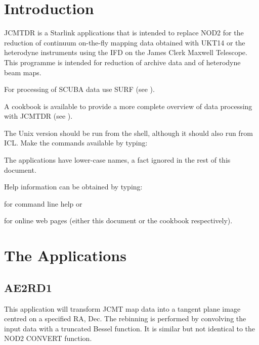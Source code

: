 \documentclass[twoside,11pt,nolof]{starlink}
\begin{document}
\scfrontmatter

\section{Introduction}

JCMTDR is a Starlink applications that is intended to replace NOD2 \cite{nod2}
for the reduction of continuum on-the-fly mapping data obtained with UKT14
\cite{ukt14} or the heterodyne instruments using the IFD on the James Clerk
Maxwell Telescope. This programme is intended for reduction of archive data
and of heterodyne beam maps.

For processing of SCUBA data use SURF (see ).

A cookbook is available to provide a more complete overview of data processing
with JCMTDR (see ).

The Unix version should be run from the shell, although it should also
run from ICL. Make the commands available by typing:

\begin{terminalv}
\end{terminalv}

The applications have lower-case names, a fact ignored in the rest of
this document.

Help information can be obtained by typing:

\begin{terminalv}
\end{terminalv}

for command line help or

\begin{terminalv}
\end{terminalv}

for online web pages (either this document or the cookbook respectively).

\goodbreak

\section{The Applications}

\subsection{AE2RD1}

This application will transform JCMT map data into a tangent  plane
image centred on a specified RA, Dec. The rebinning is performed by
convolving the input data with a truncated Bessel function. It is
similar but not identical to the NOD2 CONVERT function.
\end{document}
